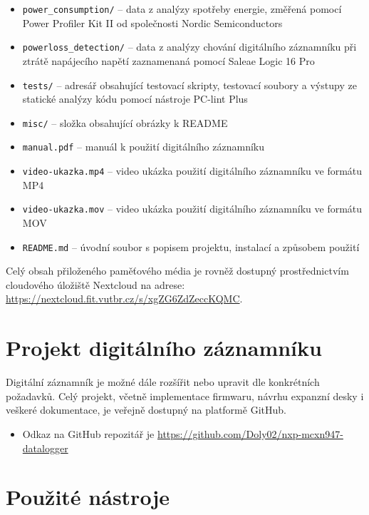 \begin{itemize}
    
    \item \texttt{power\_consumption/} -- data z analýzy spotřeby energie, změřená pomocí Power Profiler Kit II od společnosti Nordic Semiconductors

    \item \texttt{powerloss\_detection/} -- data z analýzy chování digitálního záznamníku při ztrátě napájecího napětí zaznamenaná pomocí Saleae Logic 16 Pro
    
    \item \texttt{tests/} -- adresář obsahující testovací skripty, testovací soubory a výstupy ze statické analýzy kódu pomocí nástroje PC-lint Plus

    \item \texttt{misc/} -- složka obsahující obrázky k README


    \item \texttt{manual.pdf} -- manuál k použití digitálního záznamníku
    \item \texttt{video-ukazka.mp4} -- video ukázka použití digitálního záznamníku ve formátu MP4
    \item \texttt{video-ukazka.mov} -- video ukázka použití digitálního záznamníku ve formátu MOV
    \item \texttt{README.md} -- úvodní soubor s popisem projektu, instalací a způsobem použití
\end{itemize}

Celý obsah přiloženého paměťového média je rovněž dostupný prostřednictvím cloudového úložiště Nextcloud na adrese: \url{https://nextcloud.fit.vutbr.cz/s/xgZG6ZdZeccKQMC}.

\chapter{Projekt digitálního záznamníku}
Digitální záznamník je možné dále rozšířit nebo upravit dle konkrétních požadavků. Celý projekt, včetně implementace firmwaru, návrhu expanzní desky i veškeré dokumentace, je veřejně dostupný na platformě GitHub.

\begin{itemize}
    \item Odkaz na GitHub repozitář je \url{https://github.com/Doly02/nxp-mcxn947-datalogger}
\end{itemize}
    
\chapter{Použité nástroje}

